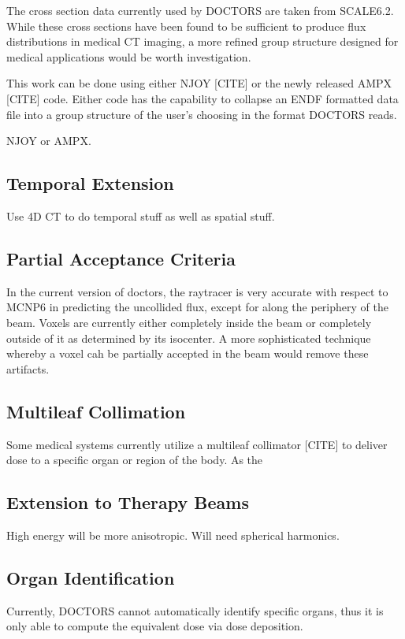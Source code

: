 The cross section data currently used by DOCTORS are taken from SCALE6.2. While these cross sections have been found to be sufficient to produce flux distributions in medical CT imaging, a more refined group structure designed for medical applications would be worth investigation.

This work can be done using either NJOY [CITE] or the newly released AMPX [CITE] code. Either code has the capability to collapse an ENDF formatted data file into a group structure of the user's choosing in the format DOCTORS reads.

NJOY or AMPX.

\subsection{Temporal Extension}
Use 4D CT to do temporal stuff as well as spatial stuff.

\subsection{Partial Acceptance Criteria}
In the current version of doctors, the raytracer is very accurate with respect to MCNP6 in predicting the uncollided flux, except for along the periphery of the beam. Voxels are currently either completely inside the beam or completely outside of it as determined by its isocenter. A more sophisticated technique whereby a voxel cah be partially accepted in the beam would remove these artifacts.

\subsection{Multileaf Collimation}
Some medical systems currently utilize a multileaf collimator [CITE] to deliver dose to a specific organ or region of the body. As the 

\subsection{Extension to Therapy Beams}
High energy will be more anisotropic. Will need spherical harmonics.

\subsection{Organ Identification}
Currently, DOCTORS cannot automatically identify specific organs, thus it is only able to compute the equivalent dose via dose deposition.

\endinput
